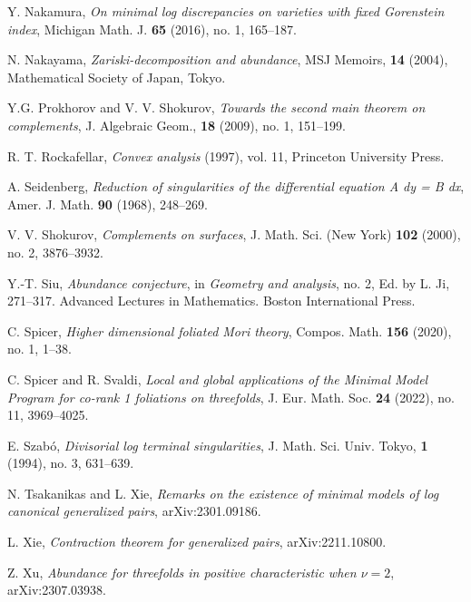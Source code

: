 \documentclass[11pt]{amsart}
\numberwithin{equation}{section}
\theoremstyle{definition}
\theoremstyle{definition}
\theoremstyle{definition}
\begin{document}
\begin{thebibliography}{99}
 Y. Nakamura, \textit{On minimal log discrepancies on varieties with fixed Gorenstein index}, Michigan Math. J. \textbf{65} (2016), no. 1, 165--187.

 N. Nakayama, \textit{Zariski-decomposition and abundance}, MSJ Memoirs, \textbf{14} (2004), Mathematical Society of Japan, Tokyo.

 Y.G. Prokhorov and V. V. Shokurov, \textit{Towards the second main theorem on complements}, J. Algebraic Geom., \textbf{18} (2009), no. 1, 151--199.

  R. T. Rockafellar, \textit{Convex analysis} (1997), vol. 11, Princeton University Press.

 A. Seidenberg, \textit{Reduction of singularities of the differential equation A dy = B dx}, Amer. J. Math. \textbf{90} (1968), 248--269.

 V. V. Shokurov, \textit{Complements on surfaces}, J. Math. Sci. (New York) \textbf{102} (2000), no. 2, 3876--3932.

 Y.-T. Siu, \textit{Abundance conjecture}, in \textit{ Geometry and analysis}, no. 2, Ed. by L. Ji, 271--317. Advanced Lectures in Mathematics. Boston International Press.

 C. Spicer, \textit{Higher dimensional foliated Mori theory}, Compos. Math. \textbf{156} (2020), no. 1, 1--38.

 C. Spicer and R. Svaldi, \textit{Local and global applications of the Minimal Model Program for co-rank 1 foliations on threefolds}, J. Eur. Math. Soc. \textbf{24} (2022), no. 11, 3969--4025.

 E. Szab\'o, \textit{Divisorial log terminal singularities}, J. Math. Sci. Univ. Tokyo, \textbf{1} (1994), no. 3, 631--639.

 N. Tsakanikas and L. Xie, \textit{Remarks on the existence of minimal models of log canonical generalized pairs}, arXiv:2301.09186.

 L. Xie, \textit{Contraction theorem for generalized pairs}, arXiv:2211.10800.

 Z. Xu, \textit{Abundance for threefolds in positive characteristic when $\nu=2$}, arXiv:2307.03938.

\end{thebibliography}
\end{document}
